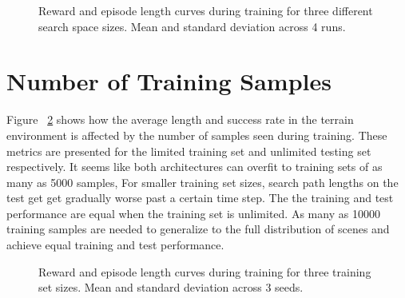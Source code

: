 \begin{figure}
    \centering
    
    
    
    \label{fig:shape}
    \caption[Search space size learning curve.]{Reward and episode length curves during training for three different search space sizes. Mean and standard deviation across 4 runs.}
\end{figure}

\section{Number of Training Samples}

Figure ~\ref{fig:sample} shows how the average length and success rate in the terrain environment is affected by the number of samples seen during training.
These metrics are presented for the limited training set and unlimited testing set respectively.
It seems like both architectures can overfit to training sets of as many as 5000 samples,
For smaller training set sizes, search path lengths on the test get get gradually worse past a certain time step.
The the training and test performance are equal when the training set is unlimited.
As many as 10000 training samples are needed to generalize to the full distribution of scenes and achieve equal training and test performance. 

\begin{figure}
    \centering
    
    
    
    
    \label{fig:sample}
    \caption[Generalization results.]{Reward and episode length curves during training for three training set sizes. Mean and standard deviation across 3 seeds.}
\end{figure}
